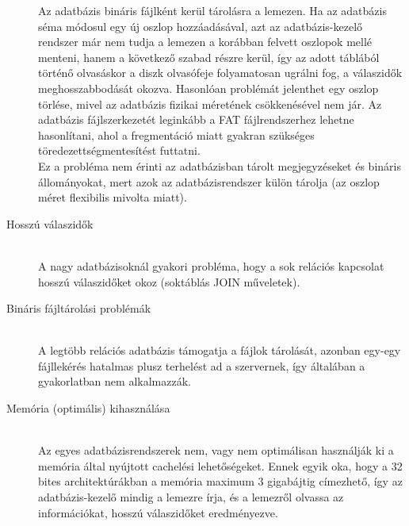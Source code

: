 \begin{description}
		Az adatbázis bináris fájlként kerül tárolásra a lemezen. Ha az adatbázis séma módosul egy új oszlop hozzáadásával, azt az adatbázis-kezelő rendszer már nem tudja  a lemezen a korábban felvett oszlopok mellé menteni, hanem a következő szabad részre kerül, így az adott táblából történő olvasáskor a diszk olvasófeje folyamatosan ugrálni fog, a válaszidők meghosszabbodását okozva. Hasonlóan problémát jelenthet egy oszlop törlése, mivel az adatbázis fizikai méretének csökkenésével nem jár. Az adatbázis fájlszerkezetét leginkább a FAT fájlrendszerhez lehetne hasonlítani, ahol a fregmentáció miatt gyakran szükséges töredezettségmentesítést futtatni.\\
		Ez a probléma nem érinti az adatbázisban tárolt megjegyzéseket és bináris állományokat, mert azok az adatbázisrendszer külön tárolja (az oszlop méret flexibilis mivolta miatt).
	\item[Hosszú válaszidők] \hfill \\
		A nagy adatbázisoknál gyakori probléma, hogy a sok relációs kapcsolat hosszú válaszidőket okoz (soktáblás JOIN műveletek).
	\item[Bináris fájltárolási problémák] \hfill \\
		A legtöbb relációs adatbázis támogatja a fájlok tárolását, azonban egy-egy fájllekérés hatalmas plusz terhelést ad a szervernek, így általában a gyakorlatban nem alkalmazzák.
	\item[Memória (optimális) kihasználása] \hfill \\
		Az egyes adatbázisrendszerek nem, vagy nem optimálisan használják ki a memória által nyújtott cachelési lehetőségeket. Ennek egyik oka, hogy a 32 bites architektúrákban a memória maximum 3 gigabájtig címezhető, így az adatbázis-kezelő mindig a lemezre írja, és a lemezről olvassa az információkat, hosszú válaszidőket eredményezve.
\end{description}

